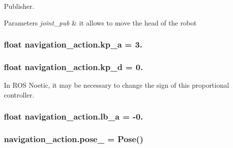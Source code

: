 Publisher. 


\begin{DoxyParams}{Parameters}
{\em joint\+\_\+pub} & it allows to move the head of the robot \\
\hline
\end{DoxyParams}
\subsubsection[{\texorpdfstring{kp\+\_\+a}{kp_a}}]{\setlength{\rightskip}{0pt plus 5cm}float navigation\+\_\+action.\+kp\+\_\+a = 3.}\hypertarget{namespacenavigation__action_a88d77c73344c091f0e27e30f34b149cc}{}\label{namespacenavigation__action_a88d77c73344c091f0e27e30f34b149cc}
\subsubsection[{\texorpdfstring{kp\+\_\+d}{kp_d}}]{\setlength{\rightskip}{0pt plus 5cm}float navigation\+\_\+action.\+kp\+\_\+d = 0.}\hypertarget{namespacenavigation__action_a34478a1ef79cccac170cae8f045a4018}{}\label{namespacenavigation__action_a34478a1ef79cccac170cae8f045a4018}


In R\+OS Noetic, it may be necessary to change the sign of this proportional controller. 

\subsubsection[{\texorpdfstring{lb\+\_\+a}{lb_a}}]{\setlength{\rightskip}{0pt plus 5cm}float navigation\+\_\+action.\+lb\+\_\+a = -\/0.}\hypertarget{namespacenavigation__action_aa1239a696c81960bbb147a15f3f3bd87}{}\label{namespacenavigation__action_aa1239a696c81960bbb147a15f3f3bd87}
\subsubsection[{\texorpdfstring{pose\+\_\+}{pose_}}]{\setlength{\rightskip}{0pt plus 5cm}navigation\+\_\+action.\+pose\+\_\+ = Pose()}\hypertarget{namespacenavigation__action_ad906a8ccc8be8e7aac7662be3092c3b7}{}\label{namespacenavigation__action_ad906a8ccc8be8e7aac7662be3092c3b7}
